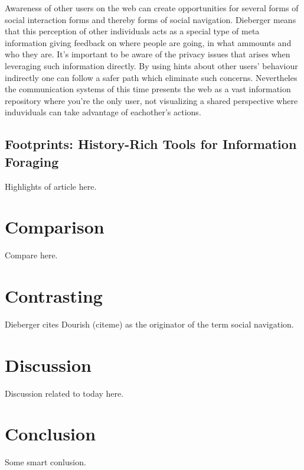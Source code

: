 \documentclass[12pt,a4paper]{article}
\begin{document}
Awareness of other users on the web can create opportunities for several forms
of social interaction forms and thereby forms of social navigation. Dieberger
means that this perception of other individuals acts as a special type of meta
information giving feedback on where people are going, in what ammounts and
who they are. It's important to be aware of the privacy issues that arises
when leveraging such information directly. By using hints about other users'
behaviour indirectly one can follow a safer path which eliminate such
concerns. Nevertheles the communication systems of this time presents the web
as a vast information repository where you're the only user, not visualizing a
shared perspective where induviduals can take advantage of eachother's
actions.



\subsection{Footprints: History-Rich Tools for Information Foraging}

Highlights of article here.

\section{Comparison}

Compare here.

\section{Contrasting}

Dieberger cites Dourish (citeme) as the originator of the term social
navigation.

\section{Discussion}

Discussion related to today here.

\section{Conclusion}

Some smart conlusion.

\section{}




\end{document}

